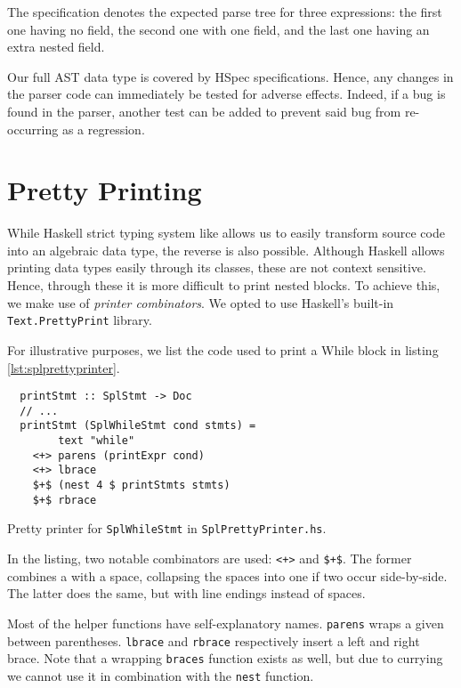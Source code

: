 The specification denotes the expected parse tree for three expressions: the first one having no field, the second one with one field, and the last one having an extra nested field.

Our full AST data type is covered by HSpec specifications.
Hence, any changes in the parser code can immediately be tested for adverse effects.
Indeed, if a bug is found in the parser, another test can be added to prevent said bug from re-occurring as a regression.

\section{Pretty Printing}

While Haskell strict typing system like allows us to easily transform source code into an algebraic data type, the reverse is also possible.
Although Haskell allows printing data types easily through its  classes, these are not context sensitive.
Hence, through these it is more difficult to print nested blocks.
To achieve this, we make use of \emph{printer combinators}.
We opted to use Haskell's built-in \texttt{Text.PrettyPrint} library.

For illustrative purposes, we list the code used to print a \textsf{While} block in listing \ref{lst:splprettyprinter}.

\begin{listing}
\begin{verbatim}
  printStmt :: SplStmt -> Doc
  // ...
  printStmt (SplWhileStmt cond stmts) =
        text "while"
    <+> parens (printExpr cond)
    <+> lbrace
    $+$ (nest 4 $ printStmts stmts)
    $+$ rbrace
\end{verbatim}
\caption{Pretty printer for \texttt{SplWhileStmt} in \texttt{SplPrettyPrinter.hs}.}
\label{lst:splprettyprinter}
\end{listing}

In the listing, two notable combinators are used: \texttt{<+>} and \texttt{\$+\$}. The former combines a  with a space, collapsing the spaces into one if two occur side-by-side. The latter does the same, but with line endings instead of spaces.

Most of the helper functions have self-explanatory names.
\texttt{parens} wraps a given  between parentheses.
\texttt{lbrace} and \texttt{rbrace} respectively insert a left and right brace.
Note that a wrapping \texttt{braces} function exists as well, but due to currying we cannot use it in combination with the \texttt{nest} function.

